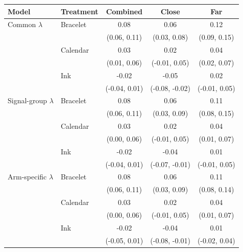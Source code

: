 \begin{tabular}{llccc}
\toprule
Model & Treatment & Combined & Close & Far \\
\midrule
Common $\lambda$ & Bracelet & 0.08 & 0.06 & 0.12 \\
 &  & (0.06, 0.11) & (0.03, 0.08) & (0.09, 0.15) \\
 & Calendar & 0.03 & 0.02 & 0.04 \\
 &  & (0.01, 0.06) & (-0.01, 0.05) & (0.02, 0.07) \\
 & Ink & -0.02 & -0.05 & 0.02 \\
 &  & (-0.04, 0.01) & (-0.08, -0.02) & (-0.01, 0.05) \\
\midrule
Signal-group $\lambda$ & Bracelet & 0.08 & 0.06 & 0.11 \\
 &  & (0.06, 0.11) & (0.03, 0.09) & (0.08, 0.15) \\
 & Calendar & 0.03 & 0.02 & 0.04 \\
 &  & (0.00, 0.06) & (-0.01, 0.05) & (0.01, 0.07) \\
 & Ink & -0.02 & -0.04 & 0.01 \\
 &  & (-0.04, 0.01) & (-0.07, -0.01) & (-0.01, 0.05) \\
\midrule
Arm-specific $\lambda$ & Bracelet & 0.08 & 0.06 & 0.11 \\
 &  & (0.06, 0.11) & (0.03, 0.09) & (0.08, 0.14) \\
 & Calendar & 0.03 & 0.02 & 0.04 \\
 &  & (0.00, 0.06) & (-0.01, 0.05) & (0.01, 0.07) \\
 & Ink & -0.02 & -0.04 & 0.01 \\
 &  & (-0.05, 0.01) & (-0.08, -0.01) & (-0.02, 0.04) \\
\bottomrule
\end{tabular}

